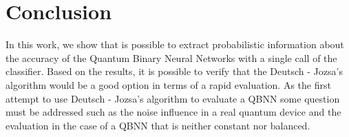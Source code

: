 \documentclass[conference]{IEEEtran}
\begin{document}
\section{Conclusion}\label{sec:conclusion}

  In this work, we show that is possible to extract probabilistic information about the accuracy of the
  Quantum Binary Neural Networks with a single call of the classifier.
  Based on the results, it is possible to verify that the Deutsch - Jozsa's algorithm would be a good option in terms
  of a rapid evaluation.
  As the first attempt to use Deutsch - Jozsa's algorithm to evaluate a QBNN some question must be addressed such as the
  noise influence in a real quantum device and the evaluation in the case of a QBNN that is neither constant nor balanced.




\end{document}
